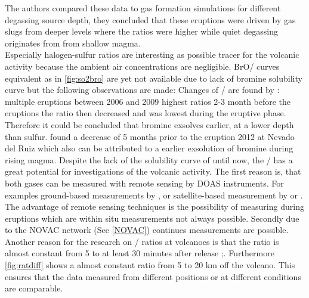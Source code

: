 \documentclass  [
  paper    = a4,
  BCOR     = 10mm,
  twoside,
  fontsize = 12pt,
  fleqn,
  toc      = bibnumbered,
  toc      = listofnumbered,
  numbers  = noendperiod,
  headings = normal,
  listof   = leveldown,
  version  = 3.03
]                                       {scrreprt}
\begin{document}
The authors compared these data to gas formation simulations for different degassing source depth, they concluded that these eruptions were driven by gas slugs from deeper levels where the ratios were higher while quiet degassing originates from from shallow magma.\\
%
Especially halogen-sulfur ratios are interesting as possible tracer for the volcanic activity because the ambient air concentrations are negligible.
BrO/  curves equivalent as in \cref{fig:so2bro} are yet not available due to lack of  bromine solubility curve but the following observations are made:
%
Changes of /  are found by \citet{bobrowski2006bromine}: multiple eruptions between 2006 and 2009 highest ratios 2-3 month before the eruptions the ratio then decreased and was lowest during the eruptive phase. Therefore it could be concluded that bromine exsolves earlier, at a lower depth than sulfur.
%
\citet{lubcke2014bro} found a decrease of   5 months prior to the eruption 2012 at Nevado del Ruiz which also can be attributed to a earlier exsolution of bromine during rising magma.
%
Despite the lack of the solubility curve of   until now, the /  has a great potential for investigations of the volcanic activity. The first reason is, that both gases can be measured with remote sensing by DOAS instruments. For examples ground-based measurements by \citet{bobrowski2007reactive}, \citet{lubcke2014optical} or satellite-based measurement by \citet{hormann2013systematic} or \citet{beirle2014estimating}. The advantage of remote sensing techniques is the possibility of measuring during eruptions which are within situ measurements not always possible.
Secondly due to the NOVAC network (See \cref{NOVAC}) continues measurements are possible.\\
Another reason for the research on /  ratios at volcanoes is that the ratio is almost constant from 5 to at least 30 minutes after release \citep{bobrowski2007reactive};\citep{lubcke2014optical}. Furthermore \cref{fig:ratdiff} shows a almost constant ratio from 5 to 20 km off the volcano. This ensures that the data measured from different positions or at different conditions are comparable.\\
\\
\end{document}
